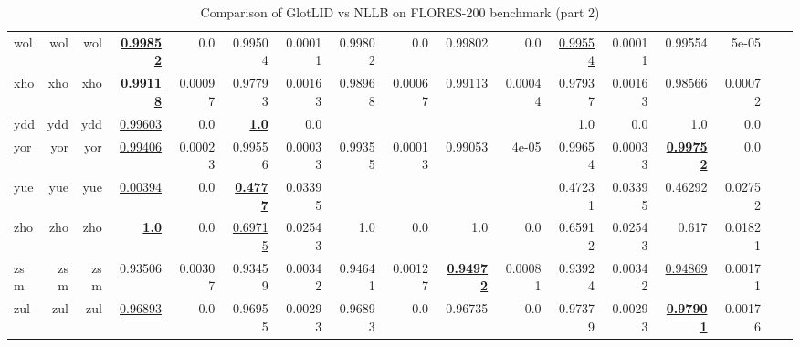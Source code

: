 \documentclass[11pt]{article}
\def\flores{FLORES\xspace}
\def\nllb{NLLB\xspace}
\begin{document}
\begin{table*}[h]
{\begin{tabular}{lrrrrrrrrrrrrrrrr}
wol         & wol         & wol         & \textbf{\underline{0.99852}}         & 0.0         & 0.99504         & 0.00011         & 0.99802         & 0.0         & 0.99802         & 0.0         & \underline{0.99554}         & 0.00011         & 0.99554         & 5e-05         \\
xho         & xho         & xho         & \textbf{\underline{0.99118}}         & 0.00097         & 0.97793         & 0.00163         & 0.98968         & 0.00067         & 0.99113         & 0.00044         & 0.97937         & 0.00163         & \underline{0.98566}         & 0.00072         \\
ydd         & ydd         & ydd         & \underline{0.99603}         & 0.0         & \textbf{\underline{1.0}}         & 0.0         &         &         &         &         & 1.0         & 0.0         & 1.0         & 0.0         \\
yor         & yor         & yor         & \underline{0.99406}         & 0.00023         & 0.99556         & 0.00033         & 0.99355         & 0.00013         & 0.99053         & 4e-05         & 0.99654         & 0.00033         & \textbf{\underline{0.99752}}         & 0.0         \\
yue         & yue         & yue         & \underline{0.00394}         & 0.0         & \textbf{\underline{0.4777}}         & 0.03395         &         &         &         &         & 0.47231         & 0.03395         & 0.46292         & 0.02752         \\
zho         & zho         & zho         & \textbf{\underline{1.0}}         & 0.0         & \underline{0.69715}         & 0.02543         & 1.0         & 0.0         & 1.0         & 0.0         & 0.65912         & 0.02543         & 0.617         & 0.01821         \\
zsm         & zsm         & zsm         & 0.93506         & 0.00307         & 0.93459         & 0.00342         & 0.94641         & 0.00127         & \textbf{\underline{0.94972}}         & 0.00081         & 0.93924         & 0.00342         & \underline{0.94869}         & 0.00171         \\
zul         & zul         & zul         & \underline{0.96893}         & 0.0         & 0.96955         & 0.00293         & 0.96893         & 0.0         & 0.96735         & 0.0         & 0.97379         & 0.00293         & \textbf{\underline{0.97901}}         & 0.00176         \\
\end{tabular}
}
\caption{Comparison of GlotLID vs \nllb on \flores-200 benchmark (part 2)}
\label{tab:appendix_glotlid_nllb_floress_2}
\end{table*}
 
\end{document}
